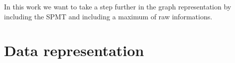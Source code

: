 \documentclass[../main.tex]{subfiles}
\begin{document}
In this work we want to take a step further in the graph representation by including the SPMT and including a maximum of raw informations.

\section{Data representation}
\label{sec:jgnn:data}
\end{document}

